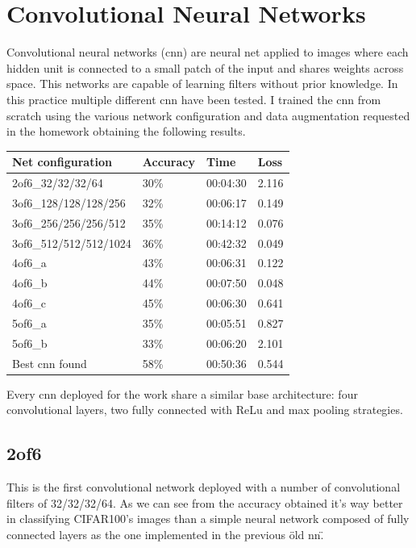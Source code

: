 \documentclass[11pt]{article}
\begin{document}
\section{Convolutional Neural Networks}\label{cnn}\hypertarget{cnn}{}
Convolutional neural networks (cnn) are neural net applied to images where each hidden unit is connected to a small patch of the input and shares weights across space. This networks are capable of learning filters without prior knowledge. \newline
In this practice multiple different cnn have been tested.\newline
I trained the cnn from scratch using the various network configuration and data augmentation requested in the homework obtaining the following results. \newline
\begin{center}
    \begin{tabular}{ | l | l | l | l |}
    \hline
    Net configuration & Accuracy & Time & Loss \\ \hline
    2of6\_32/32/32/64 & 30\% & 00:04:30 & 2.116 \\ \hline
    3of6\_128/128/128/256 & 32\% & 00:06:17 & 0.149 \\ \hline
    3of6\_256/256/256/512 & 35\% & 00:14:12 & 0.076 \\ \hline
    3of6\_512/512/512/1024 & 36\% & 00:42:32 & 0.049 \\ \hline
    4of6\_a & 43\% & 00:06:31 & 0.122 \\ \hline
    4of6\_b & 44\% & 00:07:50 & 0.048 \\ \hline
    4of6\_c & 45\% & 00:06:30 & 0.641 \\ \hline
    5of6\_a & 35\% & 00:05:51 & 0.827 \\ \hline
    5of6\_b & 33\% & 00:06:20 & 2.101 \\ \hline
    Best cnn found & 58\% & 00:50:36 & 0.544 \\ \hline
    \end{tabular}
\end{center}
Every cnn deployed for the work share a similar base architecture: four convolutional layers, two fully connected with ReLu and max pooling strategies.
\subsection{2of6}
This is the first convolutional network deployed with a number of convolutional filters of 32/32/32/64. As we can see from the accuracy obtained it's way better in classifying CIFAR100's images than a simple neural network composed of fully connected layers as the one implemented in the previous \"old nn\".
\end{document}
